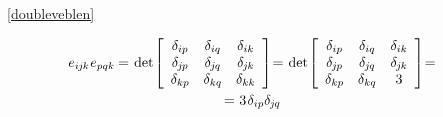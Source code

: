 ~\eqref{doubleveblen}
~%

\nopagebreak\vspace{-0.2em}
\begin{equation*}\begin{array}{c}
e_{i\hspace{-0.1ex}j\hspace{-0.1ex}k} \hspace{.1ex} e_{pqk} \hspace{-0.1ex} = \hspace{.2ex}
\operatorname{det} \hspace{-0.25ex} \left[
\begin{array}{ccc}
\delta_{ip} & \delta_{iq} & \delta_{ik} \\
\delta_{\hspace{-0.1ex}j\hspace{-0.1ex}p} & \delta_{\hspace{-0.1ex}j\hspace{-0.1ex}q} & \delta_{\hspace{-0.1ex}j\hspace{-0.1ex}k} \\
\delta_{kp} & \delta_{kq} & \delta_{kk}
\end{array}
\right] \hspace{-0.5ex} = \hspace{.2ex}
\operatorname{det} \hspace{-0.25ex} \left[
\begin{array}{ccc}
\delta_{ip} & \delta_{iq} & \delta_{ik} \\
\delta_{\hspace{-0.1ex}j\hspace{-0.1ex}p} & \delta_{\hspace{-0.1ex}j\hspace{-0.1ex}q} & \delta_{\hspace{-0.1ex}j\hspace{-0.1ex}k} \\
\delta_{kp} & \delta_{kq} & 3
\end{array}
\right] \hspace{-0.5ex} =
\\[1.5em]
%
= \hspace{.1ex} 3 \hspace{.2ex} \delta_{ip} \delta_{\hspace{-0.1ex}j\hspace{-0.1ex}q} \hspace{-0.1ex}

\end{array}
\end{equation*}
